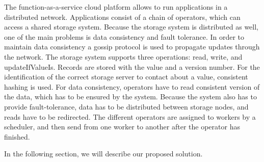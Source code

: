\documentclass[times, 10pt,twocolumn]{article}
\begin{document}
The function-as-a-service cloud platform allows to run applications in a distributed network.
Applications consist of a chain of operators, which can access a shared storage system.
Because the storage system is distributed as well, one of the main problems is data consistency and fault tolerance.
In order to maintain data consistency a gossip protocol is used to propagate updates through the network.
The storage system supports three operations: read, write, and updateIfValueIs.
Records are stored with the value and a version number.
For the identification of the correct storage server to contact about a value, consistent hashing is used.
For data consistency, operators have to read consistent version of the data, which has to be ensured by the system.
Because the system also has to provide fault-tolerance, data has to be distributed between storage nodes, and reads have to be redirected.
The different operators are assigned to workers by a scheduler, and then send from one worker to another after the operator has finished.


In the following section, we will describe our proposed solution. \newline
\end{document}
